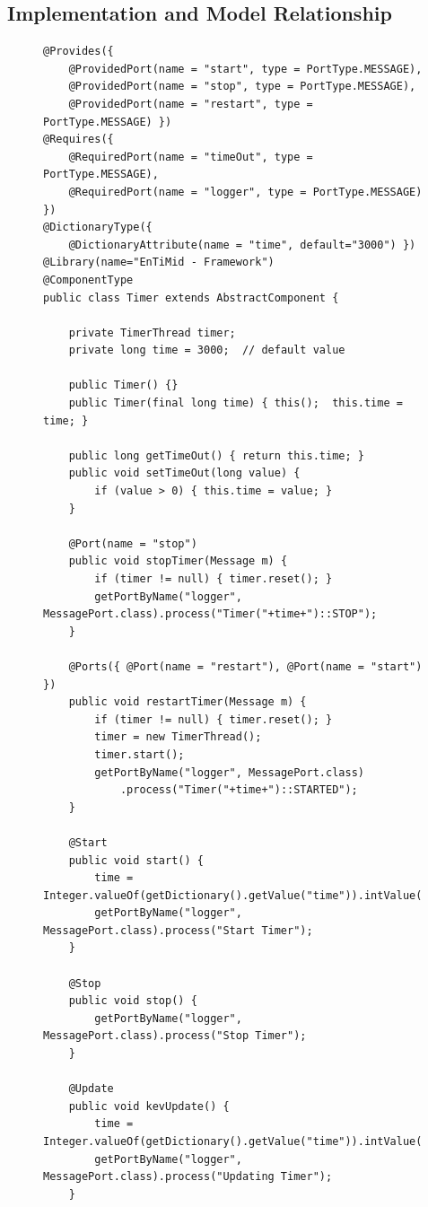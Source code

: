 \subsection{Implementation and Model Relationship}
\label{subsec:compModBinToModel}
\begin{figure}
\centering
\begin{lstlisting}[caption=Java class POJO annotation,label=fig:jcPOJOannot,basicstyle=\scriptsize\ttfamily,tabsize=2 ]
@Provides({
    @ProvidedPort(name = "start", type = PortType.MESSAGE),
    @ProvidedPort(name = "stop", type = PortType.MESSAGE),
    @ProvidedPort(name = "restart", type = PortType.MESSAGE) })
@Requires({
    @RequiredPort(name = "timeOut", type = PortType.MESSAGE),
    @RequiredPort(name = "logger", type = PortType.MESSAGE) })
@DictionaryType({
    @DictionaryAttribute(name = "time", default="3000") })
@Library(name="EnTiMid - Framework")
@ComponentType
public class Timer extends AbstractComponent {

	private TimerThread timer;
	private long time = 3000;  // default value

	public Timer() {}
	public Timer(final long time) { this();  this.time = time; }

	public long getTimeOut() { return this.time; }    
	public void setTimeOut(long value) {
		if (value > 0) { this.time = value; }
	}

	@Port(name = "stop")
	public void stopTimer(Message m) {
		if (timer != null) { timer.reset(); }
		getPortByName("logger", MessagePort.class).process("Timer("+time+")::STOP");
	}

	@Ports({ @Port(name = "restart"), @Port(name = "start") })
	public void restartTimer(Message m) {
		if (timer != null) { timer.reset(); }
		timer = new TimerThread();
		timer.start();
		getPortByName("logger", MessagePort.class)
			.process("Timer("+time+")::STARTED");
	}

	@Start
	public void start() {
		time = Integer.valueOf(getDictionary().getValue("time")).intValue();
		getPortByName("logger", MessagePort.class).process("Start Timer");
	}

	@Stop
	public void stop() {
		getPortByName("logger", MessagePort.class).process("Stop Timer");
	}

	@Update
	public void kevUpdate() {
		time = Integer.valueOf(getDictionary().getValue("time")).intValue();
		getPortByName("logger", MessagePort.class).process("Updating Timer");
	}
\end{lstlisting} 
\end{figure}



